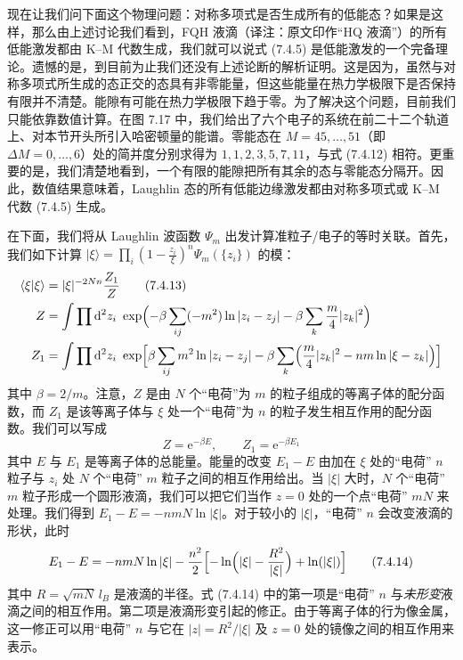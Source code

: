 现在让我们问下面这个物理问题：对称多项式是否生成所有的低能态？如果是这样，那么由上述讨论我们看到，FQH 液滴（译注：原文印作“HQ 液滴”）的所有低能激发都由 K--M 代数生成，我们就可以说式 (7.4.5) 是低能激发的一个完备理论。遗憾的是，到目前为止我们还没有上述论断的解析证明。这是因为，虽然与对称多项式所生成的态正交的态具有非零能量，但这些能量在热力学极限下是否保持有限并不清楚。能隙有可能在热力学极限下趋于零。为了解决这个问题，目前我们只能依靠数值计算。在图 7.17 中，我们给出了六个电子的系统在前二十二个轨道上、对本节开头所引入哈密顿量的能谱。零能态在 $M=45,\ldots,51$（即 $\Delta M=0,\ldots,6$）处的简并度分别求得为 $1,1,2,3,5,7,11$，与式 (7.4.12) 相符。更重要的是，我们清楚地看到，一个有限的能隙把所有其余的态与零能态分隔开。因此，数值结果意味着，Laughlin 态的所有低能边缘激发都由对称多项式或 K--M 代数 (7.4.5) 生成。


在下面，我们将从 Laughlin 波函数 $\Psi_m$ 出发计算准粒子/电子的等时关联。首先，我们如下计算 $|\xi\rangle=\prod_i(1-\frac{z_i}{\xi})^n\Psi_m(\{z_i\})$ 的模：
\begin{align*}
\langle\xi|\xi\rangle&=|\xi|^{-2Nn}\frac{Z_1}{Z}\tag{7.4.13}\\
Z&=\int\prod\mathrm{d}^2z_i\ \exp\Bigl(-\beta\sum_{ij}(-m^2)\ln|z_i-z_j|-\beta\sum_k\frac{m}{4}|z_k|^2\Bigr)\\
Z_1&=\int\prod\mathrm{d}^2z_i\ \exp\Bigl[\beta\sum_{ij}m^2\ln|z_i-z_j|-\beta\sum_k\Bigl(\frac{m}{4}|z_k|^2-nm\ln|\xi-z_k|\Bigr)\Bigr]
\end{align*}
其中 $\beta=2/m$。注意，$Z$ 是由 $N$ 个“电荷”为 $m$ 的粒子组成的等离子体的配分函数，而 $Z_1$ 是该等离子体与 $\xi$ 处一个“电荷”为 $n$ 的粒子发生相互作用的配分函数。我们可以写成
\begin{equation*}
Z=\mathrm{e}^{-\beta E},\qquad Z_1=\mathrm{e}^{-\beta E_1}
\end{equation*}
其中 $E$ 与 $E_1$ 是等离子体的总能量。能量的改变 $E_1-E$ 由加在 $\xi$ 处的“电荷” $n$ 粒子与 $z_i$ 处 $N$ 个“电荷” $m$ 粒子之间的相互作用给出。当 $|\xi|$ 大时，$N$ 个“电荷” $m$ 粒子形成一个圆形液滴，我们可以把它们当作 $z=0$ 处的一个点“电荷” $mN$ 来处理。我们得到 $E_1-E=-nmN\ln|\xi|$。对于较小的 $|\xi|$，“电荷” $n$ 会改变液滴的形状，此时
\begin{equation*}
E_1-E=-nmN\ln|\xi|-\frac{n^2}{2}\Bigl[-\ln\Bigl(|\xi|-\frac{R^2}{|\xi|}\Bigr)+\ln(|\xi|)\Bigr]
\tag{7.4.14}
\end{equation*}
其中 $R=\sqrt{mN}\,l_B$ 是液滴的半径。式 (7.4.14) 中的第一项是“电荷” $n$ 与\emph{未形变}液滴之间的相互作用。第二项是液滴形变引起的修正。由于等离子体的行为像金属，这一修正可以用“电荷” $n$ 与它在 $|z|=R^2/|\xi|$ 及 $z=0$ 处的镜像之间的相互作用来表示。

